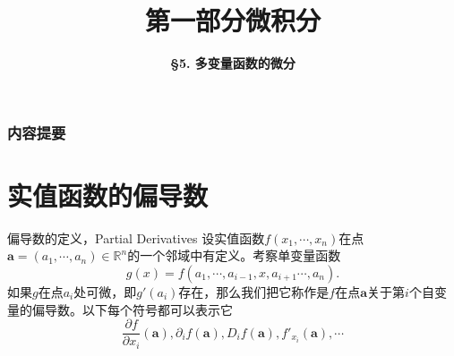 




\title[Calculus]{\LARGE \bfseries 第一部分\quad 微积分} %
\author[Differential of Multivariate Functions] %
{\Large \bfseries \S 5. 多变量函数的微分
}
\date{}



\begin{frame}
\titlepage %
\end{frame}

\begin{frame}
\frametitle{内容提要} %
\tableofcontents %
\end{frame}


\section{实值函数的偏导数} %


\begin{frame}

\begin{block}{偏导数的定义，Partial Derivatives}
设实值函数$f(x_1,\cdots,x_n)$在点$\mathbf{a} = (a_1,\cdots,a_n) \in \mathbb{R}^n$的一个邻域中有定义。考察单变量函数
$$g(x) = f(a_1,\cdots,a_{i-1},x,a_{i+1}\cdots,a_n).$$
如果$g$在点$a_i$处可微，即$g'(a_i)$存在，那么我们把它称作是$f$在点$\mathbf{a}$关于第$i$个自变量的偏导数。以下每个符号都可以表示它
$$\dfrac{\partial f}{\partial x_i}(\mathbf{a}), \partial_i f(\mathbf{a}), D_i f(\mathbf{a}), f'_{x_i}(\mathbf{a}),\cdots$$
\end{block}

\end{frame}

